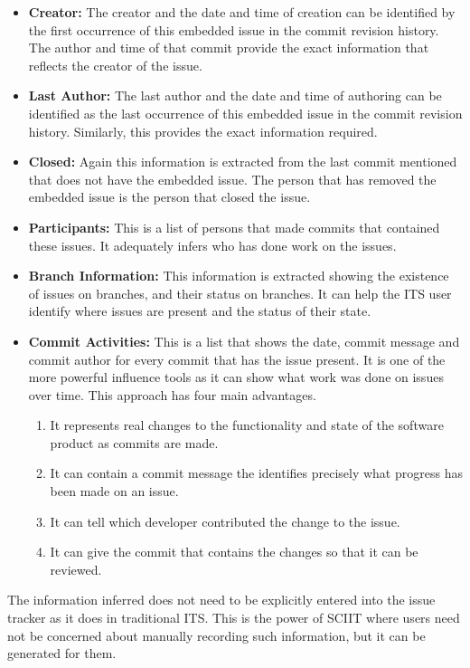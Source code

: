 \documentclass{mproj}
\begin{document}
\begin{itemize}
    \item \textbf{Creator:} The creator and the date and time of creation can be identified by the first occurrence of this embedded issue in the commit revision history. The author and time of that commit provide the exact information that reflects the creator of the issue.
    \item \textbf{Last Author:} The last author and the date and time of authoring can be identified as the last occurrence of this embedded issue in the commit revision history. Similarly, this provides the exact information required.
    \item \textbf{Closed:} Again this information is extracted from the last commit mentioned that does not have the embedded issue. The person that has removed the embedded issue is the person that closed the issue.
    \item \textbf{Participants:} This is a list of persons that made commits that contained these issues. It adequately infers who has done work on the issues.
    \item \textbf{Branch Information:} This information is extracted showing the existence of issues on branches, and their status on branches. It can help the ITS user identify where issues are present and the status of their state.
    \item \textbf{Commit Activities:} This is a list that shows the date, commit message and commit author for every commit that has the issue present. It is one of the more powerful influence tools as it can show what work was done on issues over time. This approach has four main advantages.
  \begin{enumerate}
    \item It represents real changes to the functionality and state of the software product as commits are made.
    \item It can contain a commit message the identifies precisely what progress has been made on an issue.
    \item It can tell which developer contributed the change to the issue.
    \item It can give the commit that contains the changes so that it can be reviewed.
  \end{enumerate}

\end{itemize}

The information inferred does not need to be explicitly entered into the issue tracker as it does in traditional ITS. This is the power of SCIIT where users need not be concerned about manually recording such information, but it can be generated for them.
\end{document}
